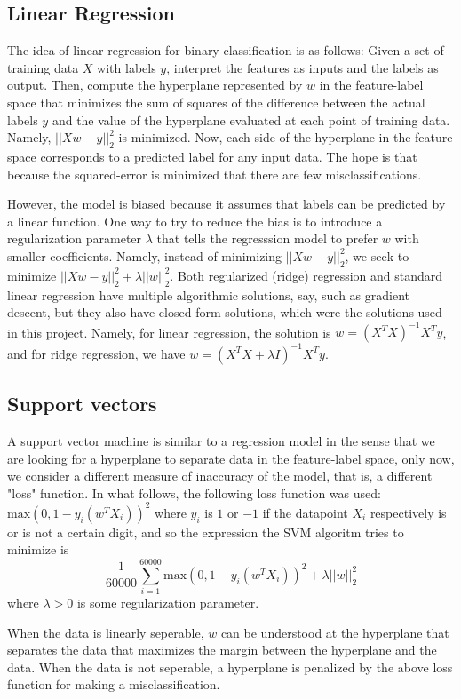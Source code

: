 \documentclass{article}
\begin{document}
\subsection{Linear Regression}

The idea of linear regression for binary classification is as follows: Given a set of training data $X$ with labels $y$, interpret the features as inputs and the labels as output. Then, compute the hyperplane represented by $w$ in the feature-label space that minimizes the sum of squares of the difference between the actual labels $y$ and the value of the hyperplane evaluated at each point of training data. Namely, $||Xw - y||^2_2$ is minimized. Now, each side of the hyperplane in the feature space corresponds to a predicted label for any input data. The hope is that because the squared-error is minimized that there are few misclassifications. 

However, the model is biased because it assumes that labels can be predicted by a linear function. One way to try to reduce the bias is to introduce a regularization parameter $\lambda$ that tells the regresssion model to prefer $w$ with smaller coefficients. Namely, instead of minimizing $||Xw - y||^2_2$, we seek to minimize $||Xw - y||^2_2 + \lambda ||w||_2^2$. Both regularized (ridge) regression and standard linear regression have multiple algorithmic solutions, say, such as gradient descent, but they also have closed-form solutions, which were the solutions used in this project. Namely, for linear regression, the solution is $w = (X^TX)^{-1} X^T y$, and for ridge regression, we have $w = (X^TX + \lambda I)^{-1} X^T y$.

\subsection{Support vectors} A support vector machine is similar to a regression model in the sense that we are looking for a hyperplane to separate data in the feature-label space, only now, we consider a different measure of inaccuracy of the model, that is, a different "loss" function. In what follows, the following loss function was used: $\mbox{max}(0,1-y_i (w^T X_i))^2$ where $y_i$ is $1$ or $-1$ if the datapoint $X_i$ respectively is or is not a certain digit, and so the expression the SVM algoritm tries to minimize is $$\frac{1}{60000} \sum_{i = 1}^{60000} \mbox{max}(0,1-y_i (w^T X_i))^2  + \lambda ||w||_2^2$$ where $\lambda > 0$ is some regularization parameter. 

When the data is linearly seperable, $w$ can be understood at the hyperplane that separates the data that maximizes the margin between the hyperplane and the data. When the data is not seperable, a hyperplane is penalized by the above loss function for making a misclassification. 
\end{document}
